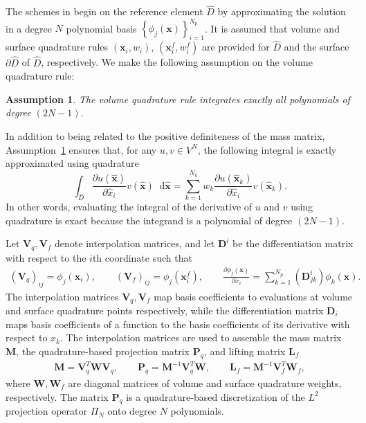 \documentclass[review]{siamart0216}
\theoremstyle{assumption}
\newtheorem{assumption}{Assumption}
\renewcommand{\hat}[1]{\widehat{#1}}
\newcommand{\pd}[2]{\frac{\partial#1}{\partial#2}}
\newcommand{\LRp}[1]{\left( #1 \right)}
\newcommand{\LRc}[1]{\left\{ #1 \right\}}
\newcommand{\note}[1]{{\color{blue}{#1}}}
\newcommand*\diff[1]{\mathop{}\!{\mathrm{d}#1}}
\begin{document}
The schemes in \cite{chan2017discretely} begin on the reference element $\hat{D}$ by approximating the solution in a degree $N$ polynomial basis $\LRc{\phi_j({\bm{x}})}_{i=1}^{N_p}$.  It is assumed that volume and surface quadrature rules $({\bm{x}}_i, w_i)$, $\LRp{{\bm{x}}^f_i,w^f_i}$ are provided for $\hat{D}$ and the surface $\partial \hat{D}$ of $\hat{D}$, respectively.  We make the following assumption on the volume quadrature rule:
\begin{assumption}
The volume quadrature rule integrates exactly all polynomials of degree $(2N-1)$.
\label{ass:quad}
\end{assumption}
In addition to being related to the positive definiteness of the mass matrix, Assumption~\ref{ass:quad} ensures that, for any $u,v \in V^N$, the following integral is exactly approximated using quadrature
\[
\int_{\hat{D}} \pd{u(\hat{\bm{x}})}{\hat{x}_i} v(\hat{\bm{x}})\diff{\hat{\bm{x}}} = \sum_{k=1}^{N_q} w_k \pd{u(\hat{\bm{x}}_k)}{\hat{x}_i} v(\hat{\bm{x}}_k).  
\]
In other words, evaluating the integral of the derivative of $u$ and $v$ using quadrature is exact because the integrand is a polynomial of degree $(2N-1)$.  

\note{TODO: Standardize hat notation for operators/normals: can refer to operators on reference element and do $k$ superscript for physical elements, or do hats on reference element.}

Let $\bm{V}_q,\bm{V}_f$ denote interpolation matrices, and let $\bm{D}^i$ be the differentiation matrix with respect to the $i$th coordinate such that
\begin{gather}
\LRp{\bm{V}_q}_{ij} = \phi_j(\bm{x}_i), \qquad \LRp{\bm{V}_f}_{ij} = \phi_j(\bm{x}^f_i), \qquad \pd{\phi_j(\bm{x})}{x_i} = \sum_{k=1}^{N_p} \LRp{\bm{D}^i_{jk}} \phi_k(\bm{x}).
\end{gather}
The interpolation matrices $\bm{V}_q,\bm{V}_f$ map basis coefficients to evaluations at volume and surface quadrature points respectively, while the differentiation matrix ${\bm{D}}_i$ maps basis coefficients of a function to the basis coefficients of its derivative with respect to $x_k$.  The interpolation matrices are used to assemble the mass matrix $\bm{M}$, the quadrature-based projection matrix $\bm{P}_q$, and lifting matrix $\bm{L}_f$
\begin{gather}
\bm{M} = \bm{V}_q^T\bm{W}\bm{V}_q, \qquad \bm{P}_q = \bm{M}^{-1}\bm{V}_q^T\bm{W}, \qquad \bm{L}_f = \bm{M}^{-1}\bm{V}_f^T\bm{W}_f,
\end{gather}
where $\bm{W}, \bm{W}_f$ are diagonal matrices of volume and surface quadrature weights, respectively.  The matrix $\bm{P}_q$ is a quadrature-based discretization of the $L^2$ projection operator $\Pi_N$ onto degree $N$ polynomials.
\end{document}
